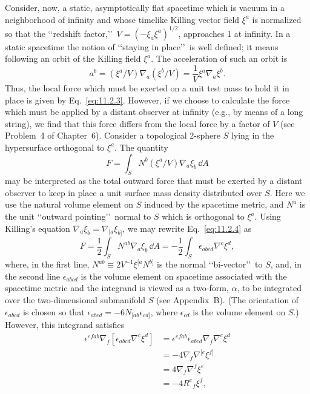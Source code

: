 Consider, now, a static, asymptotically flat spacetime which is vacuum in a
neighborhood of infinity and whose timelike Killing vector field \(\xi^a\) is
normalized so that the \lq\lq redshift factor,\rq\rq\
\(V=(-\xi_a\xi^a)^{1/2}\), approaches 1 at infinity. In a static spacetime the
notion of \lq\lq staying in place\rq\rq\ is well defined; it means following an orbit of
the Killing field \(\xi^a\). The acceleration of such an orbit is
\begin{equation}
  a^b=(\xi^a/V)\nabla_a(\xi^b/V)
      =\frac{1}{V}\xi^a\nabla_a\xi^b.
  \tag{11.2.3}\label{eq:11.2.3}
\end{equation}
Thus, the local force which must be exerted on a unit test mass to hold it in place
is given by Eq.~\eqref{eq:11.2.3}. However, if we choose to calculate the force which
must be applied by a distant observer at infinity (e.g., by means of a long string),
we find that this force differs from the local force by a factor of \(V\) (see
Problem~4 of Chapter~6). Consider a topological 2-sphere \(S\) lying in the
hypersurface orthogonal to \(\xi^a\). The quantity
\begin{equation}
  F=\int_S N^b(\xi^a/V)\nabla_a\xi_b\,\dd A
  \tag{11.2.4}\label{eq:11.2.4}
\end{equation}
may be interpreted as the total outward force that must be exerted by a distant
observer to keep in place a unit surface mass density distributed over \(S\). Here we
use the natural volume element on \(S\) induced by the spacetime metric, and \(N^a\)
is the unit \lq\lq outward pointing\rq\rq\ normal to \(S\) which is orthogonal to
\(\xi^a\). Using Killing's equation \(\nabla_a\xi_b=\nabla_{[a}\xi_{b]}\), we may
rewrite Eq.~\eqref{eq:11.2.4} as
\begin{equation}
  F=\frac12\int_S N^{ab}\nabla_a\xi_b\,\dd A
   =-\frac12\int_S\epsilon_{abcd}\nabla^c\xi^d,
  \tag{11.2.5}\label{eq:11.2.5}
\end{equation}
where, in the first line, \(N^{ab}\equiv2V^{-1}\xi^{[a}N^{b]}\) is the normal
\lq\lq bi-vector\rq\rq\ to \(S\), and, in the second line \(\epsilon_{abcd}\) is the
volume element on spacetime associated with the spacetime metric and the integrand
is viewed as a two-form, \(\alpha\), to be integrated over the two-dimensional
submanifold \(S\) (see Appendix~B). (The orientation of \(\epsilon_{abcd}\) is chosen
so that \(\epsilon_{abcd}=-6N_{[ab}\epsilon_{cd]}\), where \(\epsilon_{cd}\) is the
volume element on \(S\).) However, this integrand satisfies
\begin{equation}
  \begin{aligned}
  \epsilon^{efab}\nabla_f[\epsilon_{abcd}\nabla^c\xi^d]
  &=\epsilon^{efab}\epsilon_{abcd}\nabla_f\nabla^c\xi^d\\
  &=-4\nabla_f\nabla^{[e}\xi^{f]}\\
  &=4\nabla_f\nabla^f\xi^e\\
  &=-4R^e{}_f\xi^f,
  \end{aligned}
  \tag{11.2.6}\label{eq:11.2.6}
\end{equation}
